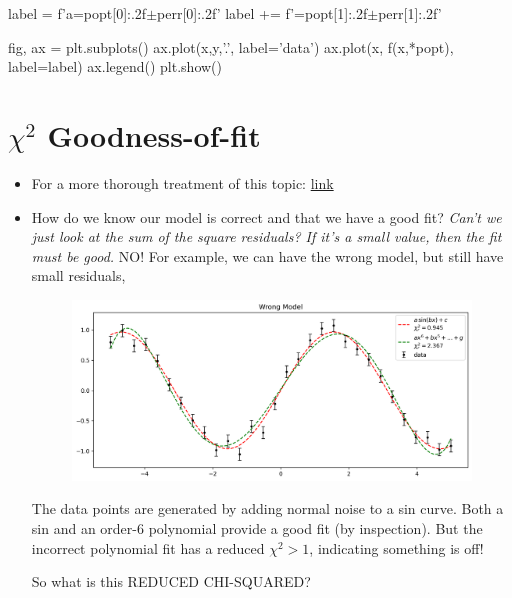 \documentclass[12pt]{article}
\numberwithin{equation}{section}
\begin{document}
\begin{itemize}
\begin{python}
label = f'a={popt[0]:.2f}$\pm${perr[0]:.2f}'
label += f'\nb={popt[1]:.2f}$\pm${perr[1]:.2f}'

fig, ax = plt.subplots()
ax.plot(x,y,'.', label='data')
ax.plot(x, f(x,*popt), label=label)
ax.legend()
plt.show()
\end{python}

\end{itemize}

\section{$\chi^2$ Goodness-of-fit}
\begin{itemize}
\item For a more thorough treatment of this topic: \href{https://www.ocf.berkeley.edu/~yizhu/static/notes/Chi%20Squared/chi_squared.pdf}{link}
\item How do we know our model is correct and that we have a good fit? \textit{Can't we just look at the sum of the square residuals? If it's a small value, then the fit must be good.} NO! For example, we can have the wrong model, but still have small residuals, 
\begin{figure}[H]
	\centering
	\includegraphics[width=15cm] {wrong}
\end{figure}
The data points are generated by adding normal noise to a sin curve. Both a sin and an order-6 polynomial provide a good fit (by inspection). But the incorrect polynomial fit has a reduced $ \chi^2 >1$, indicating something is off!

So what is this REDUCED CHI-SQUARED?


\end{itemize}
\end{document}
